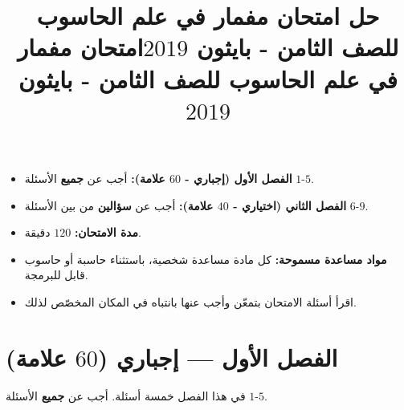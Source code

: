 \documentclass[14pt]{extarticle}
\title{حل امتحان مفمار في علم الحاسوب للصف الثامن - بايثون $2019$}
\title{امتحان مفمار في علم الحاسوب للصف الثامن - بايثون $2019$}
\begin{document}
\maketitle
\thispagestyle{fancy}

\ifwithsols
\else
\begin{boxCode}
\begin{itemize}[nosep]
    \item \textbf{الفصل الأول (إجباري - $60$ علامة):} أجب عن \textbf{جميع} الأسئلة $1$-$5$.
    \item \textbf{الفصل الثاني (اختياري - $40$ علامة):} أجب عن \textbf{سؤالين} من بين الأسئلة $6$-$9$.
    \item \textbf{مدة الامتحان:} $120$ دقيقة.
    \item \textbf{مواد مساعدة مسموحة:} كل مادة مساعدة شخصية، باستثناء حاسبة أو حاسوب قابل للبرمجة.
    \item اقرأ أسئلة الامتحان بتمعّن وأجب عنها بانتباه في المكان المخصّص لذلك.
\end{itemize}
\end{boxCode}
\fi

\section*{الفصل الأول — إجباري ($60$ علامة)}
في هذا الفصل خمسة أسئلة. أجب عن \textbf{جميع} الأسئلة $1$-$5$.
\end{document}
